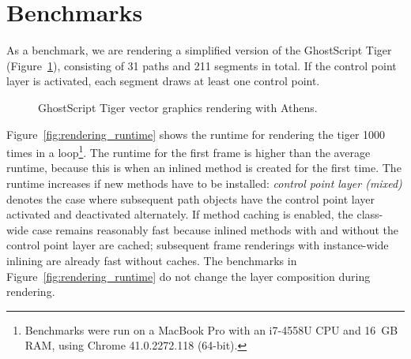\documentclass{sig-alternate}
\begin{document}
\section{Benchmarks}
\label{sec:bench}
As a benchmark, we are rendering a simplified version of the GhostScript Tiger (Figure~\ref{fig:gs_tiger}), consisting of 31 paths and 211 segments in total. If the control point layer is activated, each segment draws at least one control point.

\begin{figure}[t]
        \centering
        \hfill
    \caption{GhostScript Tiger vector graphics rendering with Athens.}
    \label{fig:gs_tiger}
\end{figure}

Figure~\ref{fig:rendering_runtime} shows the runtime for rendering the tiger 1000 times in a loop\footnote{Benchmarks were run on a MacBook Pro with an i7-4558U CPU and 16~GB RAM, using Chrome 41.0.2272.118 (64-bit).}. The runtime for the first frame is higher than the average runtime, because this is when an inlined method is created for the first time. The runtime increases if new methods have to be installed: \emph{control point layer (mixed)} denotes the case where subsequent path objects have the control point layer activated and deactivated alternately. If method caching is enabled, the class-wide case remains reasonably fast because inlined methods with and without the control point layer are cached; subsequent frame renderings with instance-wide inlining are already fast without caches. The benchmarks in Figure~\ref{fig:rendering_runtime} do not change the layer composition during rendering. 
\end{document}
